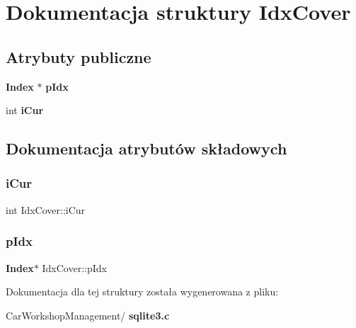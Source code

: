 \section{Dokumentacja struktury Idx\+Cover}
\label{struct_idx_cover}
\subsection*{Atrybuty publiczne}
\begin{DoxyCompactItemize}
\item 
\textbf{ Index} $\ast$ \textbf{ p\+Idx}
\item 
int \textbf{ i\+Cur}
\end{DoxyCompactItemize}


\subsection{Dokumentacja atrybutów składowych}
\mbox{\label{struct_idx_cover_ab7d59e1b07eecac9aaf9bcd9f7d8edc0}} 
\subsubsection{iCur}
{\footnotesize\ttfamily int Idx\+Cover\+::i\+Cur}

\mbox{\label{struct_idx_cover_a5ccfb55ea6898b63aee5626a6ee5365e}} 
\subsubsection{pIdx}
{\footnotesize\ttfamily \textbf{ Index}$\ast$ Idx\+Cover\+::p\+Idx}



Dokumentacja dla tej struktury została wygenerowana z pliku\+:\begin{DoxyCompactItemize}
\item 
Car\+Workshop\+Management/\textbf{ sqlite3.\+c}\end{DoxyCompactItemize}
